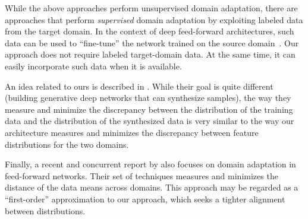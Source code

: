 While the above approaches perform unsupervised domain adaptation, there are approaches that perform {\em supervised} domain adaptation by exploiting labeled data from the target domain. In the context of deep feed-forward architectures, such data can be used to ``fine-tune'' the network trained on the source domain~\cite{Zeiler13,Oquab14,Babenko14}. Our approach does not require labeled target-domain data. At the same time, it can easily incorporate such data when it is available.

An idea related to ours is described in \cite{Goodfellow14}. While their goal is quite different (building generative deep networks that can synthesize samples), the way they measure and minimize the discrepancy between the distribution of the training data and the distribution of the synthesized data is very similar to the way our architecture measures and minimizes the discrepancy between feature distributions for the two domains.

Finally, a recent and concurrent report by \cite{Tzeng14} also focuses on domain adaptation in feed-forward networks. Their set of techniques measures and minimizes the distance of the data means across domains. This approach may be regarded as a ``first-order'' approximation to our approach, which seeks a tighter alignment between distributions.